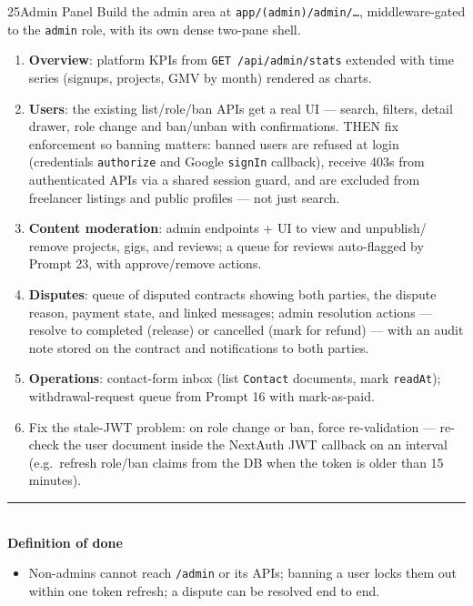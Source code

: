 \documentclass[11pt,a4paper]{article}
\newcommand{\dod}{\medskip\noindent\textcolor{donegreen}{\rule{\linewidth}{0.5pt}}\\[1mm]\textbf{\textcolor{donegreen}{Definition of done}}\\[-2mm]}
\begin{document}
\begin{promptbox}{25}{Admin Panel}
Build the admin area at \texttt{app/(admin)/admin/\ldots}, middleware-gated to the
\texttt{admin} role, with its own dense two-pane shell.

\begin{enumerate}[leftmargin=1.6em]
  \item \textbf{Overview}: platform KPIs from \texttt{GET /api/admin/stats} extended
        with time series (signups, projects, GMV by month) rendered as charts.
  \item \textbf{Users}: the existing list/role/ban APIs get a real UI --- search,
        filters, detail drawer, role change and ban/unban with confirmations. THEN fix
        enforcement so banning matters: banned users are refused at login
        (credentials \texttt{authorize} and Google \texttt{signIn} callback), receive
        403s from authenticated APIs via a shared session guard, and are excluded
        from freelancer listings and public profiles --- not just search.
  \item \textbf{Content moderation}: admin endpoints + UI to view and unpublish/
        remove projects, gigs, and reviews; a queue for reviews auto-flagged by
        Prompt 23, with approve/remove actions.
  \item \textbf{Disputes}: queue of disputed contracts showing both parties, the
        dispute reason, payment state, and linked messages; admin resolution actions
        --- resolve to completed (release) or cancelled (mark for refund) --- with an
        audit note stored on the contract and notifications to both parties.
  \item \textbf{Operations}: contact-form inbox (list \texttt{Contact} documents,
        mark \texttt{readAt}); withdrawal-request queue from Prompt 16 with
        mark-as-paid.
  \item Fix the stale-JWT problem: on role change or ban, force re-validation ---
        re-check the user document inside the NextAuth JWT callback on an interval
        (e.g.\ refresh role/ban claims from the DB when the token is older than
        15 minutes).
\end{enumerate}

\dod
\begin{itemize}[leftmargin=1.6em]
  \item Non-admins cannot reach \texttt{/admin} or its APIs; banning a user locks
        them out within one token refresh; a dispute can be resolved end to end.
\end{itemize}
\end{promptbox}
\end{document}
